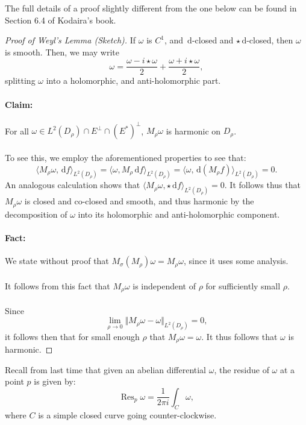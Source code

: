 \documentclass[a4paper]{report}
\theoremstyle{definition}
\theoremstyle{remark}
\theoremstyle{proposition}
\theoremstyle{conjecture}
\theoremstyle{lemma}
\theoremstyle{corollary}
\theoremstyle{exercise}
\theoremstyle{example}
\newcommand{\diff}{\,\mathrm{d}}
\newcommand{\on}{\operatorname}
\begin{document}
The full details of a proof slightly different from the one below can be found 
in Section 6.4 of Kodaira's book.
\begin{proof}[Proof of Weyl's Lemma (Sketch)]
    If $\omega$ is $C^1$, and $\diff$-closed
    and $\star\diff$-closed, then $\omega$ is smooth. Then,
    we may write 
    $$\omega = \frac{\omega -i\star\omega}{2} + \frac{\omega+i\star\omega}{2},$$
    splitting $\omega$ into a holomorphic, and anti-holomorphic part. 
    \paragraph{Claim:} For all $\omega \in L^2(D_\rho) \cap E^\perp \cap (E^\ast)^\perp$, $M_\rho\omega$ is harmonic on $D_\rho$.\\\\
    To see this, we employ the aforementioned properties to see that:
    $$\langle M_\rho\omega, \diff f\rangle_{L^2(D_\rho)} = \langle \omega, M_\rho\diff f\rangle_{L^2(D_\rho)} = \langle \omega, \diff(M_\rho f)\rangle_{L^2(D_\rho)} = 0.$$
    An analogous calculation shows that $\langle M_\rho\omega, \star\diff f\rangle_{L^2(D_\rho)} = 0$. 
    It follows thus that $M_\rho\omega$ is closed and co-closed and smooth,
    and thus harmonic by the decomposition of $\omega$ into its holomorphic
    and anti-holomorphic component.
    \paragraph{Fact:} We state without proof that 
    $M_\sigma(M_\rho)\omega = M_\rho\omega$, since it uses some analysis.\\\\
    It follows from this fact that $M_\rho\omega$ is independent of $\rho$
    for sufficiently small $\rho$.\\\\
    Since 
    $$\displaystyle\lim_{\rho\to0}\Vert M_\rho\omega - \omega\Vert_{L^2(D_\rho)} = 0,$$
    it follows then that for small enough $\rho$ that $M_\rho \omega = \omega$.
    It thus follows that $\omega$ is harmonic.

\end{proof}

Recall from last time that given an abelian differential $\omega$, the residue 
of $\omega$ at a point $p$ is given by:
$$\on{Res}_p\omega = \frac{1}{2\pi i}\int_C \omega,$$
where $C$ is a simple closed curve going counter-clockwise.
\end{document}
